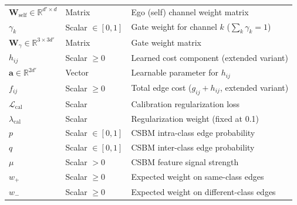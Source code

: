 \documentclass[11pt,a4paper]{article}
\newcommand{\R}{\mathbb{R}}
\newcommand{\bW}{\mathbf{W}}
\theoremstyle{definition}
\theoremstyle{plain}
\begin{document}
\begin{center}
\begin{tabular}{lll}
$\bW_{\text{self}} \in \R^{d' \times d}$ & Matrix & Ego (self) channel weight matrix \\
$\gamma_k$ & Scalar $\in [0,1]$ & Gate weight for channel $k$ ($\sum_k \gamma_k = 1$) \\
$\bW_\gamma \in \R^{3 \times 3d'}$ & Matrix & Gate weight matrix \\
$h_{ij}$ & Scalar $\geq 0$ & Learned cost component (extended variant) \\
$\mathbf{a} \in \R^{2d'}$ & Vector & Learnable parameter for $h_{ij}$ \\
$f_{ij}$ & Scalar $\geq 0$ & Total edge cost ($g_{ij} + h_{ij}$, extended variant) \\
$\mathcal{L}_{\text{cal}}$ & Scalar & Calibration regularization loss \\
$\lambda_{\text{cal}}$ & Scalar & Regularization weight (fixed at 0.1) \\
$p$ & Scalar $\in [0,1]$ & CSBM intra-class edge probability \\
$q$ & Scalar $\in [0,1]$ & CSBM inter-class edge probability \\
$\mu$ & Scalar $> 0$ & CSBM feature signal strength \\
$w_+$ & Scalar $\geq 0$ & Expected weight on same-class edges \\
$w_-$ & Scalar $\geq 0$ & Expected weight on different-class edges \\
\bottomrule
\end{tabular}
\end{center}
\end{document}
